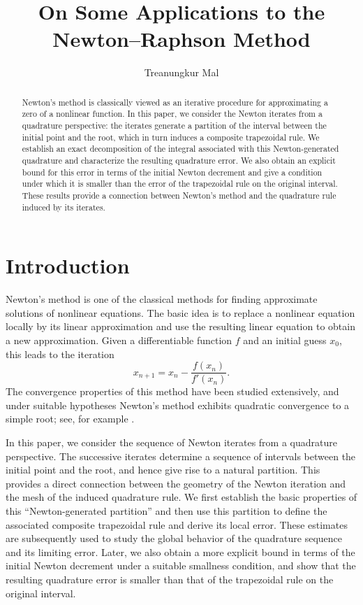 \documentclass[psamsfonts,reqno]{amsart}
\title{On Some Applications to the Newton--Raphson Method}
\author{Treanungkur Mal}
\date{}
\theoremstyle{plain}
\theoremstyle{definition}
\theoremstyle{remark}
\numberwithin{equation}{section}
\begin{document}
\maketitle


\begin{abstract}
Newton's method is classically viewed as an iterative procedure for
approximating a zero of a nonlinear function. In this paper, we consider
the Newton iterates from a quadrature perspective: the iterates generate a partition of the interval between the initial point and the
root, which in turn induces a composite trapezoidal rule. We establish an
exact decomposition of the integral associated with this Newton-generated
quadrature and characterize the resulting quadrature error. We also obtain
an explicit bound for this error in terms of the initial Newton decrement
and give a condition under which it is smaller than the error of the trapezoidal rule on the original interval. These results provide
a connection between Newton's method and the quadrature rule
induced by its iterates.
\end{abstract}

\tableofcontents



\section{Introduction}

Newton's method is one of the classical methods for finding approximate
solutions of nonlinear equations. The basic
idea is to replace a nonlinear equation locally by its linear
approximation and use the resulting linear equation to obtain a new
approximation. Given a differentiable function $f$ and an initial guess
$x_0$, this leads to the iteration
\[
x_{n+1}=x_n-\frac{f(x_n)}{f'(x_n)}.
\]
The convergence properties of this method have been studied extensively,
and under suitable hypotheses Newton's method exhibits quadratic
convergence to a simple root; see, for example \cite{Kantorovich,OrtegaRheinboldt}.

In this paper, we consider the sequence of Newton iterates from a
quadrature perspective. The successive iterates determine a sequence of
intervals between the initial point and the root, and hence give rise to a
natural partition. This provides a direct connection
between the geometry of the Newton iteration and the mesh of the induced
quadrature rule. We first establish the basic properties of this ``Newton-generated
partition'' and then use this partition to
define the associated composite trapezoidal rule and derive its local
error. These estimates are subsequently used to study the
global behavior of the quadrature sequence and its limiting error. Later, we also obtain a more explicit bound in terms of the initial Newton decrement under a suitable smallness condition, and show that the resulting quadrature error is smaller than that of the trapezoidal rule on the original interval.
\end{document}
